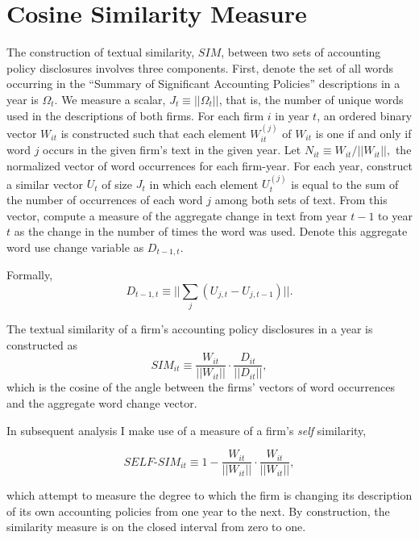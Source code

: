 \documentclass{article}
\begin{document}
\section{Cosine Similarity Measure}\label{cossim}
The construction of textual similarity, $SIM$,  between two sets of accounting policy disclosures involves three components. First, denote  the set of all words occurring in the ``Summary of Significant Accounting Policies'' descriptions in a year is $\Omega_t$. We measure a  scalar, $J_t \equiv \vert\vert \Omega_t \vert\vert$, that is, the number of unique words used in  the descriptions of both firms. For each firm $i$ in year  $t$, an ordered binary vector $W_{it}$ is constructed such that each element $W^{(j)}_{it}$ of  $W_{it}$ is one if and only if word $j$ occurs in the given firm's text in the given  year. Let $N_{it} \equiv W_{it}/\vert\vert W_{it} \vert\vert,$ the normalized vector of word  occurrences for each firm-year. For each year, construct a similar vector $U_t$ of size $J_t$ in  which each element $U^{(j)}_t$ is equal to the sum of the number of occurrences of each word $j$  among both sets of text. From this vector, compute a measure of the aggregate  change in text from year $t-1$ to year $t$ as the change in the number of times the word was used. Denote this aggregate word use change variable as  $D_{t-1,t}$. 

Formally,
\begin{equation}
D_{t-1,t} \equiv \bigg\vert\bigg\vert \sum_{j} (U_{j,t} - U_{j, t-1}) \bigg\vert\bigg\vert.
\end{equation}

The textual similarity of a firm's accounting policy disclosures in a year is constructed as
\begin{equation}
SIM_{it} \equiv \frac{W_{it}}{\vert\vert W_{it} \vert\vert} \cdot \frac{D_{it}}{\vert\vert D_{it} 
\vert\vert},
\end{equation}
which is the cosine of the angle between the firms' vectors of word occurrences and the aggregate word change vector.

In subsequent analysis I make use of a measure of a firm's \emph{self} similarity, 

\begin{equation} SELF \text{-} SIM_{it} \equiv 1 - \frac{W_{it}}{\vert \vert W_{it} \vert \vert} \cdot \frac{W_{it}}{\vert \vert W_{it} \vert \vert}, \end{equation}

which attempt to measure the degree to which the firm is changing its description of its own accounting policies from one year to the next. By construction,  the similarity measure is on the closed interval from zero to one. 
\end{document}
